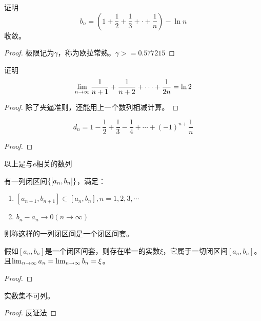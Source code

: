 \documentclass[lang=cn]{elegantbook}
\begin{document}
\begin{proposition}
证明
    \[ b_n = \left( 1 +\frac{1}{2} + \frac{1}{3} + \cdot + \frac{1}{n} \right) - \ln n \]
    收敛。
\end{proposition}
\begin{proof}
    极限记为$\gamma$，称为欧拉常熟。$\gamma >= 0.577215$
\end{proof}

\begin{proposition}
证明
\[ \lim_{n \to \infty } \frac{1}{n+1} + \frac{1}{n+2} + \cdots + \frac{1}{2n} = \ln 2\]
\end{proposition}
\begin{proof}
除了夹逼准则，还能用上一个数列相减计算。
\end{proof}

\begin{proposition}
\[ d_n = 1- \frac{1}{2} + \frac{1}{3} - \frac{1}{4} + \cdots +(-1)^{n+}\frac{1}{n} \]
\end{proposition}
\begin{proof}

\end{proof}
以上是与$e$相关的数列

\begin{definition}[闭区间套]
    有一列闭区间$\left\{ \left[a_n, b_n \right]\right\}$，满足：
    \begin{enumerate}
        \item $\left[ a_{n+1}, b_{n+1}\right] \subset \left[ a_n, b_n\right], n = 1, 2, 3, \cdots $
        \item $b_n - a_n \to 0(n \to \infty)$
    \end{enumerate}
    则称这样的一列闭区间是一个闭区间套。
\end{definition}
\begin{theorem}[闭区间套定理]
    假如$\left[ a_n, b_n\right]$是一个闭区间套，则存在唯一的实数$\xi$，它属于一切闭区间$\left[ a_n, b_n\right]$。且$\lim_{n \to \infty } a_n = \lim_{n \to \infty } b_n = \xi$。
\end{theorem}
\begin{proof}
\end{proof}

\begin{theorem}
    实数集不可列。
\end{theorem}
\begin{proof}
    反证法
\end{proof}
\end{document}
